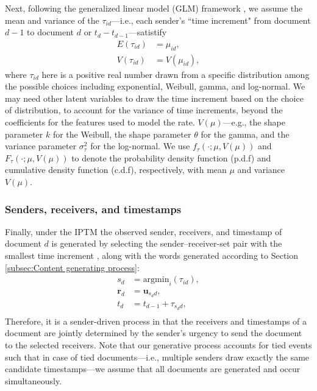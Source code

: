 \documentclass[ba]{imsart}
\numberwithin{equation}{section}
\theoremstyle{plain}
\begin{document}
	Next, following the generalized linear model (GLM) framework \citep{nelder1972generalized}, we assume the mean and variance of the $\tau_{id}$---i.e., each sender's ``time increment" from document $d-1$ to document $d$ or $t_d-t_{d-1}$---satistify
	\begin{equation}
		\begin{aligned}
			E(\tau_{id}) &= \mu_{id},\\
			V(\tau_{id}) &= V(\mu_{id}),
		\end{aligned}
	\end{equation}
	where $\tau_{id}$ here is a positive real number drawn from a specific distribution among the possible choices including exponential, Weibull, gamma, and log-normal. We may need other latent variables to draw the time increment based on the choice of distribution, to account for the variance of time increments, beyond the coefficients for the features used to model the rate. $V(\mu)$---e.g., the shape parameter $k$ for the Weibull, the shape parameter $\theta$ for the gamma, and the variance parameter $\sigma_\tau^2$ for the log-normal. We use $f_\tau(\cdot; \mu, V(\mu))$ and $F_\tau(\cdot; \mu, V(\mu))$ to denote the probability density function (p.d.f) and cumulative density function (c.d.f), respectively, with mean $\mu$ and variance $V(\mu)$.~
	\subsubsection{Senders, receivers, and timestamps}\label{subsubsec:Observed}
	Finally, under the IPTM the observed sender, receivers, and timestamp of document $d$ is generated by selecting the sender--receiver-set pair with the smallest time increment \citep{snijders1996stochastic}, along with the words generated according to Section \ref{subsec:Content generating process}:
	\begin{equation}
		\begin{aligned}
			s_d &= \mbox{argmin}_{i}(\tau_{id}),\\
			\boldsymbol{r}_d &= \boldsymbol{u}_{s_d d},\\
			t_d &=t_{d-1} + \tau_{s_d d},\\
		\end{aligned}
	\end{equation}
		Therefore, it is a sender-driven process in that the receivers and timestamps of a document are jointly determined by the sender's urgency to send the document to the selected receivers. Note that our generative process accounts for tied events such that in case of tied documents---i.e., multiple senders draw exactly the same candidate timestamps---we assume that all documents are generated and occur simultaneously. 
\end{document}
